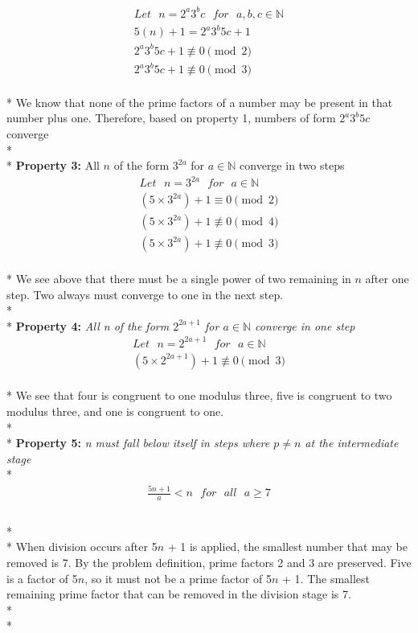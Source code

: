 \documentclass{article}
\begin{document}
\begin{gather*}
    Let\text{ } {n = 2^a 3^b c}\text{ } for \text{ } a, b, c \in \mathbb{N}\\
    5(n) + 1 = 2^a 3^b5 c + 1\\
    2^a 3^b5 c + 1 \not\equiv 0 \pmod{2}\\
    2^a 3^b5 c + 1 \not\equiv 0 \pmod{3}
\end{gather*}\\*
\indent We know that none of the prime factors of a number may be present in that number plus one. Therefore, based on property 1, numbers of form $2^a 3^b5 c$ converge\\*
\\*
\large{\textbf{Property 3:}} All $n$ of the form $3^{2a}$ for $a \in \mathbb{N}$ converge in two steps
\begin{gather*}
    Let\text{ } {n = 3^{2a}}\text{ } for \text{ } a \in \mathbb{N}\\
    (5 \times 3^{2a}) + 1 \equiv 0 \pmod{2}\\
    (5 \times 3^{2a}) + 1 \not\equiv 0 \pmod{4}\\
    (5 \times 3^{2a}) + 1 \not\equiv 0 \pmod{3}
\end{gather*}\\*
\indent We see above that there must be a single power of two remaining in $n$ after one step. Two always must converge to one in the next step.\\*
\\*
\large{\textbf{Property 4:}} \textit{All n of the form $2^{2a + 1}$ for $a \in \mathbb{N}$ converge in one step }
\begin{gather*}
    Let\text{ } {n = 2^{2a + 1}}\text{ } for \text{ } a \in \mathbb{N}\\
    (5 \times 2^{2a + 1}) + 1 \not\equiv 0 \pmod{3}
\end{gather*}\\*
\indent We see that four is congruent to one modulus three, five is congruent to two modulus three, and one is congruent to one.\\*
\\*
\large{\textbf{Property 5:}} \textit{n must fall below itself in steps where $p \not= n$ at the intermediate stage}
\\*
\begin{gather*}
     \frac{5n + 1}{a} < n \text{ } for \text{ } all \text{ } a \ge 7\\
\end{gather*}\\*
\\*
\indent When division occurs after 5$n$ + 1 is applied, the smallest number that may be removed is 7. By the problem definition, prime factors 2 and 3 are preserved. Five is a factor of 5$n$, so it must not be a prime factor of 5$n$ + 1. The smallest remaining prime factor that can be removed in the division stage is 7.\\*
\\*
\end{document}
